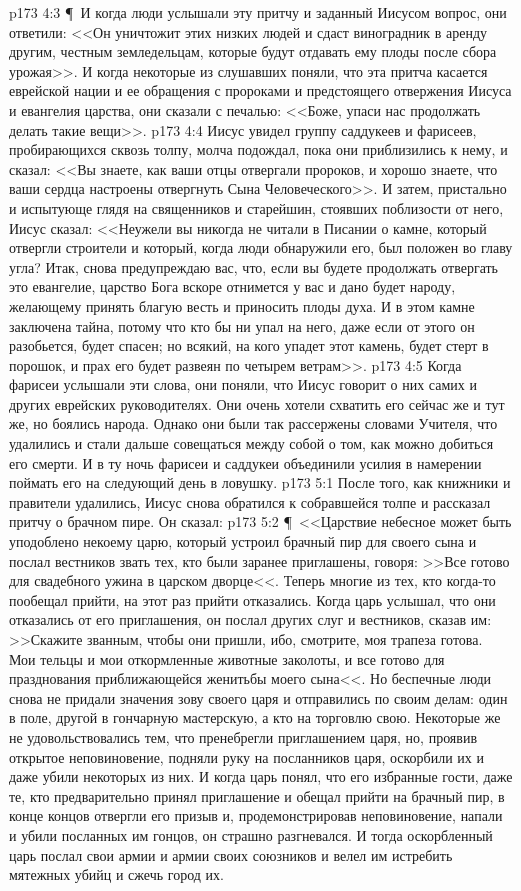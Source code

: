 \vs p173 4:3 \P\ И когда люди услышали эту притчу и заданный Иисусом вопрос, они ответили: <<Он уничтожит этих низких людей и сдаст виноградник в аренду другим, честным земледельцам, которые будут отдавать ему плоды после сбора урожая>>. И когда некоторые из слушавших поняли, что эта притча касается еврейской нации и ее обращения с пророками и предстоящего отвержения Иисуса и евангелия царства, они сказали с печалью: <<Боже, упаси нас продолжать делать такие вещи>>.
\vs p173 4:4 Иисус увидел группу саддукеев и фарисеев, пробирающихся сквозь толпу, молча подождал, пока они приблизились к нему, и сказал: <<Вы знаете, как ваши отцы отвергали пророков, и хорошо знаете, что ваши сердца настроены отвергнуть Сына Человеческого>>. И затем, пристально и испытующе глядя на священников и старейшин, стоявших поблизости от него, Иисус сказал: <<Неужели вы никогда не читали в Писании о камне, который отвергли строители и который, когда люди обнаружили его, был положен во главу угла? Итак, снова предупреждаю вас, что, если вы будете продолжать отвергать это евангелие, царство Бога вскоре отнимется у вас и дано будет народу, желающему принять благую весть и приносить плоды духа. И в этом камне заключена тайна, потому что кто бы ни упал на него, даже если от этого он разобьется, будет спасен; но всякий, на кого упадет этот камень, будет стерт в порошок, и прах его будет развеян по четырем ветрам>>.
\vs p173 4:5 Когда фарисеи услышали эти слова, они поняли, что Иисус говорит о них самих и других еврейских руководителях. Они очень хотели схватить его сейчас же и тут же, но боялись народа. Однако они были так рассержены словами Учителя, что удалились и стали дальше совещаться между собой о том, как можно добиться его смерти. И в ту ночь фарисеи и саддукеи объединили усилия в намерении поймать его на следующий день в ловушку.
\vs p173 5:1 После того, как книжники и правители удалились, Иисус снова обратился к собравшейся толпе и рассказал притчу о брачном пире. Он сказал:
\vs p173 5:2 \P\ <<Царствие небесное может быть уподоблено некоему царю, который устроил брачный пир для своего сына и послал вестников звать тех, кто были заранее приглашены, говоря: >>Все готово для свадебного ужина в царском дворце<<. Теперь многие из тех, кто когда\hyp{}то пообещал прийти, на этот раз прийти отказались. Когда царь услышал, что они отказались от его приглашения, он послал других слуг и вестников, сказав им: >>Скажите званным, чтобы они пришли, ибо, смотрите, моя трапеза готова. Мои тельцы и мои откормленные животные заколоты, и все готово для празднования приближающейся женитьбы моего сына<<. Но беспечные люди снова не придали значения зову своего царя и отправились по своим делам: один в поле, другой в гончарную мастерскую, а кто на торговлю свою. Некоторые же не удовольствовались тем, что пренебрегли приглашением царя, но, проявив открытое неповиновение, подняли руку на посланников царя, оскорбили их и даже убили некоторых из них. И когда царь понял, что его избранные гости, даже те, кто предварительно принял приглашение и обещал прийти на брачный пир, в конце концов отвергли его призыв и, продемонстрировав неповиновение, напали и убили посланных им гонцов, он страшно разгневался. И тогда оскорбленный царь послал свои армии и армии своих союзников и велел им истребить мятежных убийц и сжечь город их.
